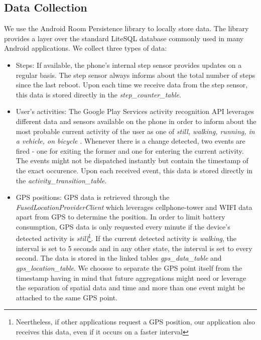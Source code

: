 \subsection {Data Collection}
We use the Android Room Persistence library \parencite{room} to locally store data. The library provides a layer over the standard LiteSQL database commonly used in many Android applications. We collect three types of data:
\begin{itemize}
	\item Steps: If available, the phone's internal step sensor provides updates on a regular basis. The step sensor always informs about the total number of steps since the last reboot. Upon each time we receive data from the step sensor, this data is stored directly in the \textit{step\_counter\_table}.
	\item User's activities: The Google Play Services  activity recognition API leverages different data and sensors available on the phone in order to inform about the most probable current activity of the user as one of \textit{still, walking, running, in a vehicle, on bicycle} \parencite{detected-activity}. Whenever there is a change detected, two events are fired - one for exiting the former and one for entering the current activity. The events might not be dispatched instantly but contain the timestamp of the exact occurence. Upon each received event, this data is stored directly in the \textit{activity\_transition\_table}.
	\item GPS positions: GPS data is retrieved through the \textit{FusedLocationProviderClient} which leverages cellphone-tower and WIFI data apart from GPS to determine the position. In order to limit battery consumption, GPS data is only requested every minute if the device's detected activity is \textit{still}\footnote{Neertheless, if other applications request a GPS position, our application also receives this data, even if it occurs on a faster interval}. If the current detected activity is \textit{walking}, the interval is set to 5 seconds and in any other state, the interval is set to every second. The data is stored in the linked tables \textit{gps\_data\_table} and \textit{gps\_location\_table}. We choosse to separate the GPS point itself from the timestamp having in mind that future aggregations might need or leverage the separation of spatial data and time and more than one event might be attached to the same GPS point.
\end{itemize}

